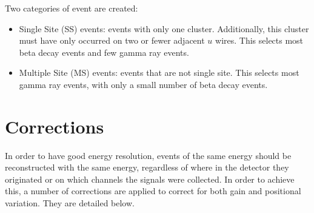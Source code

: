 \documentclass[herrin-thesis.tex]{subfiles}
\begin{document}
Two categories of event are created:
\begin{itemize}
\item Single Site (SS) events: events with only one cluster. Additionally, this cluster must have only occurred on two or fewer adjacent \(u\) wires. This selects most beta decay events and few gamma ray events.
\item Multiple Site (MS) events: events that are not single site. This selects most gamma ray events, with only a small number of beta decay events.
\end{itemize}

\section{Corrections}
In order to have good energy resolution, events of the same energy should be reconstructed with the same energy, regardless of where in the detector they originated or on which channels the signals were collected. In order to achieve this, a number of corrections are applied to correct for both gain and positional variation. They are detailed below.
\end{document}
